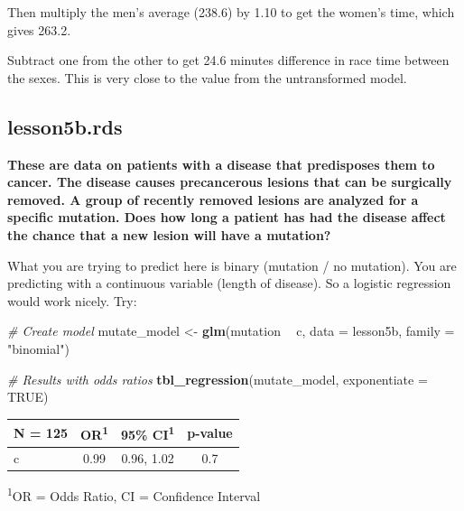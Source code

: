 \documentclass[]{book}
\newenvironment{Shaded}{\begin{snugshade}}{\end{snugshade}}
\newcommand{\CommentTok}[1]{\textcolor[rgb]{0.56,0.35,0.01}{\textit{#1}}}
\newcommand{\DataTypeTok}[1]{\textcolor[rgb]{0.13,0.29,0.53}{#1}}
\newcommand{\KeywordTok}[1]{\textcolor[rgb]{0.13,0.29,0.53}{\textbf{#1}}}
\newcommand{\NormalTok}[1]{#1}
\newcommand{\OperatorTok}[1]{\textcolor[rgb]{0.81,0.36,0.00}{\textbf{#1}}}
\newcommand{\OtherTok}[1]{\textcolor[rgb]{0.56,0.35,0.01}{#1}}
\newcommand{\StringTok}[1]{\textcolor[rgb]{0.31,0.60,0.02}{#1}}
\begin{document}
Then multiply the men's average (238.6) by 1.10 to get the women's time,
which gives 263.2.

Subtract one from the other to get 24.6 minutes difference in race time
between the sexes. This is very close to the value from the
untransformed model.

\hypertarget{lesson5b.rds}{%
\subsection{lesson5b.rds}\label{lesson5b.rds}}

\textbf{These are data on patients with a disease that predisposes them
to cancer. The disease causes precancerous lesions that can be
surgically removed. A group of recently removed lesions are analyzed for
a specific mutation. Does how long a patient has had the disease affect
the chance that a new lesion will have a mutation?}

What you are trying to predict here is binary (mutation / no mutation).
You are predicting with a continuous variable (length of disease). So a
logistic regression would work nicely. Try:

\begin{Shaded}
\begin{Highlighting}[]
\CommentTok{# Create model}
\NormalTok{mutate_model <-}\StringTok{ }\KeywordTok{glm}\NormalTok{(mutation }\OperatorTok{~}\StringTok{ }\NormalTok{c, }\DataTypeTok{data =}\NormalTok{ lesson5b, }\DataTypeTok{family =} \StringTok{"binomial"}\NormalTok{)}

\CommentTok{# Results with odds ratios}
\KeywordTok{tbl_regression}\NormalTok{(mutate_model, }\DataTypeTok{exponentiate =} \OtherTok{TRUE}\NormalTok{)}
\end{Highlighting}
\end{Shaded}

\captionsetup[table]{labelformat=empty,skip=1pt}
\begin{longtable}{lccc}
\toprule
\textbf{N = 125} & \textbf{OR}\textsuperscript{1} & \textbf{95\% CI}\textsuperscript{1} & \textbf{p-value} \\ 
\midrule
c & 0.99 & 0.96, 1.02 & 0.7 \\ 
\bottomrule
\end{longtable}
\vspace{-5mm}
\begin{minipage}{\linewidth}
\textsuperscript{1}OR = Odds Ratio, CI = Confidence Interval \\ 
\end{minipage}
\end{document}
